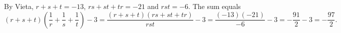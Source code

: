 By Vieta, $r+s+t=-13$, $rs+st+tr=-21$ and $rst=-6$. The sum equals
\[(r+s+t)\left(\dfrac1r+\dfrac1s+\dfrac1t\right)-3=\dfrac{(r+s+t)(rs+st+tr)}{rst}-3=\dfrac{(-13)(-21)}{-6}-3=-\dfrac{91}{2}-3=\boxed{-\dfrac{97}{2}}.\]
